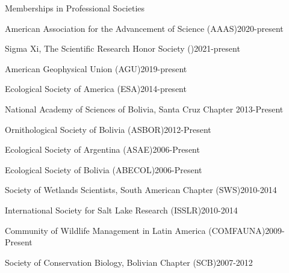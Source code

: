 \documentclass{resume} %
\begin{document}
\begin{rSection}{Memberships in Professional Societies}

\begin{esSubsection}{American Association for the Advancement of Science }{(AAAS)}{2020-present}{}{}
\end{esSubsection}

\begin{esSubsection}{Sigma Xi, The Scientific Research Honor Society }{(\textSigma  \textXi)}{2021-present}{}{}
\end{esSubsection}

\begin{esSubsection}{American Geophysical Union }{(AGU)}{2019-present}{}{}
\end{esSubsection}

\begin{esSubsection}{Ecological Society of America }{(ESA)}{2014-present}{}{}
\end{esSubsection}

\begin{esSubsection}{National Academy of Sciences of Bolivia, Santa Cruz Chapter }{}{2013-Present}{}{}
\end{esSubsection}


\begin{esSubsection}{Ornithological Society of Bolivia }{(ASBOR)}{2012-Present}{}{}
\end{esSubsection}

\begin{esSubsection}{Ecological Society of Argentina }{(ASAE)}{2006-Present}{}{}
\end{esSubsection}

\begin{esSubsection}{Ecological Society of Bolivia }{(ABECOL)}{2006-Present}{}{}
\end{esSubsection}

\begin{esSubsection}{Society of Wetlands Scientists, South American Chapter }{(SWS)}{2010-2014}{}{}
\end{esSubsection}

\begin{esSubsection}{International Society for Salt Lake Research }{(ISSLR)}{2010-2014}{}{}
\end{esSubsection}

\begin{esSubsection}{Community of Wildlife Management in Latin America }{(COMFAUNA)}{2009-Present}{}{}
\end{esSubsection}

\begin{esSubsection}{Society of Conservation Biology, Bolivian Chapter }{(SCB)}{2007-2012}{}{}
\end{esSubsection}

\end{rSection}



\clearpage
\end{document}
